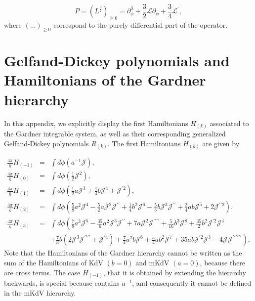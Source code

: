 \documentclass[letterpaper,11pt,oneside]{book}
\begin{document}
\[
P=\left(L^{\frac{3}{2}}\right)_{\geq0}=\partial_{\phi}^{3}+\frac{3}{2}\mathcal{L}\partial_{\phi}+\frac{3}{4}\mathcal{L}^{\prime},
\]
where $\left(\ldots\right)_{\geq0}$ correspond to the purely differential
part of the operator.

\chapter{Gelfand-Dickey polynomials and Hamiltonians of the Gardner hierarchy\label{Appendix 2: Gelfand-Dickey pol Gardner}}

In this appendix, we explicitly display the first Hamiltonians $H_{\left(k\right)}$
associated to the Gardner integrable system, as well as their corresponding
generalized Gelfand-Dickey polynomials $R_{\left(k\right)}$. The first Hamiltonians $H_{\left(k\right)}$ are given by

\begin{eqnarray}
	\frac{4\pi}{\hat{\kappa}}H_{\left(-1\right)} & = & \int d\phi\left(a^{-1}\mathcal{J}\right),\nonumber \\
	\frac{4\pi}{\hat{\kappa}}H_{\left(0\right)} & = & \int d\phi\left(\frac{1}{2}\mathcal{J}^{2}\right),\nonumber \\
	\frac{4\pi}{\hat{\kappa}}H_{\left(1\right)} & = & \int d\phi\left(\frac{1}{2}a\mathcal{J}^{3}+\frac{1}{4}b\mathcal{J}^{4}+\mathcal{J}^{\prime2}\right),\label{eq:k-thH}\\
	\frac{4\pi}{\hat{\kappa}}H_{\left(2\right)} & = & \int d\phi\left(\frac{5}{8}a^{2}\mathcal{J}^{4}-\frac{5}{2}a\mathcal{J}^{2}\mathcal{J}^{\prime\prime}+\frac{1}{4}b^{2}\mathcal{J}^{6}-\frac{5}{3}b\mathcal{J}^{3}\mathcal{J}^{\prime\prime}+\frac{3}{4}ab\mathcal{J}^{5}+2\mathcal{J}^{\prime\prime2}\right),\nonumber \\
	\frac{4\pi}{\hat{\kappa}}H_{\left(3\right)} & = & \int d\phi\left(\frac{7}{8}a^{3}\mathcal{J}^{5}-\frac{35}{6}a^{2}\mathcal{J}^{3}\mathcal{J}^{\prime\prime}+7a\mathcal{J}^{2}\mathcal{J}^{\prime\prime\prime\prime}+\frac{5}{16}b^{3}\mathcal{J}^{8}+\frac{35}{2}b^{2}\mathcal{J}^{\prime2}\mathcal{J}^{4}\right.\nonumber \\
	&  & \left.+\frac{7}{3}b\left(2\mathcal{J}^{3}\mathcal{J}^{\prime\prime\prime\prime}+\mathcal{J}^{\prime4}\right)+\frac{7}{4}a^{2}b\mathcal{J}^{6}+\frac{5}{4}ab^{2}\mathcal{J}^{7}+35ab\mathcal{J}^{\prime2}\mathcal{J}^{3}-4\mathcal{J}\mathcal{J}^{\prime\prime\prime\prime\prime\prime}\right).\nonumber 
\end{eqnarray}
Note that the Hamiltonians of the Gardner hierarchy cannot be written
as the sum of the Hamiltonians of KdV $(b=0)$ and mKdV $\left(a=0\right)$,
because there are cross terms. The case $H_{\left(-1\right)}$, that
it is obtained by extending the hierarchy backwards, is special because
contains $a^{-1}$, and consequently it cannot be defined in the mKdV
hierarchy.
\end{document}
